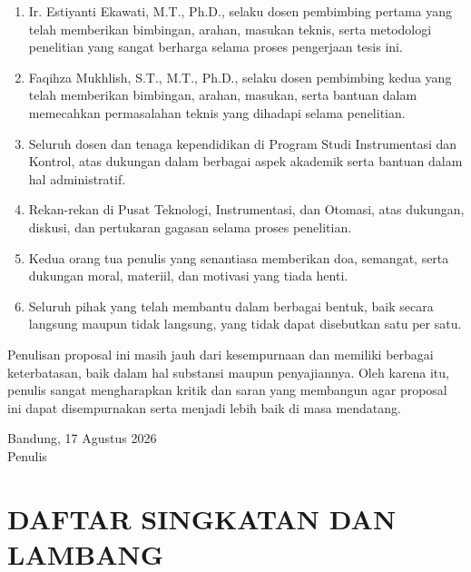 \documentclass[12pt,a4paper]{report}
\numberwithin{equation}{chapter}
\begin{document}
\begin{enumerate}
    \item Ir. Estiyanti Ekawati, M.T., Ph.D., selaku dosen pembimbing pertama yang telah memberikan bimbingan, arahan, masukan teknis, serta metodologi penelitian yang sangat berharga selama proses pengerjaan tesis ini.
    \item Faqihza Mukhlish, S.T., M.T., Ph.D., selaku dosen pembimbing kedua yang telah memberikan bimbingan, arahan, masukan, serta bantuan dalam memecahkan permasalahan teknis yang dihadapi selama penelitian.
    \item Seluruh dosen dan tenaga kependidikan di Program Studi Instrumentasi dan Kontrol, atas dukungan dalam berbagai aspek akademik serta bantuan dalam hal administratif.
    \item Rekan-rekan di Pusat Teknologi, Instrumentasi, dan Otomasi, atas dukungan, diskusi, dan pertukaran gagasan selama proses penelitian.
    \item Kedua orang tua penulis yang senantiasa memberikan doa, semangat, serta dukungan moral, materiil, dan motivasi yang tiada henti.
    \item Seluruh pihak yang telah membantu dalam berbagai bentuk, baik secara langsung maupun tidak langsung, yang tidak dapat disebutkan satu per satu.
\end{enumerate}

Penulisan proposal ini masih jauh dari kesempurnaan dan memiliki berbagai keterbatasan, baik dalam hal substansi maupun penyajiannya. Oleh karena itu, penulis sangat mengharapkan kritik dan saran yang membangun agar proposal ini dapat disempurnakan serta menjadi lebih baik di masa mendatang.

\vspace{1cm}
\begin{flushright}
    Bandung, 17 Agustus 2026\\[1.8cm]
    Penulis
\end{flushright}

\clearpage
\tableofcontents
\clearpage

\clearpage
{}
\listoffigures
\clearpage

\clearpage
{}
\listoftables
\clearpage

\chapter*{DAFTAR SINGKATAN DAN LAMBANG}
\end{document}
